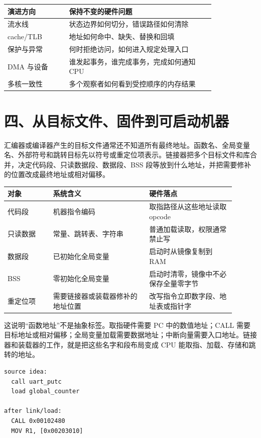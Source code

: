 \begin{longtable}{L{0.24\linewidth}L{0.58\linewidth}}
\toprule
演进方向 & 保持不变的硬件问题 \\
\midrule
流水线 & 状态边界如何切分，错误路径如何清除 \\
cache/TLB & 地址如何命中、缺失、替换和回填 \\
保护与异常 & 何时拒绝访问，如何进入规定处理入口 \\
DMA 与设备 & 谁发起事务，谁完成事务，完成如何通知 CPU \\
多核一致性 & 多个观察者如何看到受控顺序的内存结果 \\
\bottomrule
\end{longtable}

\section{四、从目标文件、固件到可启动机器}

汇编器或编译器产生的目标文件通常还不知道所有最终地址。函数名、全局变量名、外部符号和跳转目标先以符号或重定位项表示。链接器把多个目标文件和库合并，决定代码段、只读数据段、数据段、BSS 段等放到什么地址，并把需要修补的位置改成最终地址或相对偏移。

\begin{longtable}{L{0.18\linewidth}L{0.38\linewidth}L{0.34\linewidth}}
\toprule
对象 & 系统含义 & 硬件落点 \\
\midrule
代码段 & 机器指令编码 & 取指路径从这些地址读取 opcode \\
只读数据 & 常量、跳转表、字符串 & 普通加载读取，权限通常禁止写 \\
数据段 & 已初始化全局变量 & 启动时从镜像复制到 RAM \\
BSS & 零初始化全局变量 & 启动时清零，镜像中不必保存全量零字节 \\
重定位项 & 需要链接器或装载器修补的地址位置 & 改写指令立即数字段、地址表或指针字 \\
\bottomrule
\end{longtable}

这说明“函数地址”不是抽象标签。取指硬件需要 PC 中的数值地址；CALL 需要目标地址或相对偏移；全局变量加载需要数据地址；中断向量需要入口地址。链接器和装载器的工作，就是把这些名字和段布局变成 CPU 能取指、加载、存储和跳转的地址。

\begin{lstlisting}
source idea:
  call uart_putc
  load global_counter

after link/load:
  CALL 0x00102480
  MOV R1, [0x00203010]
\end{lstlisting}


